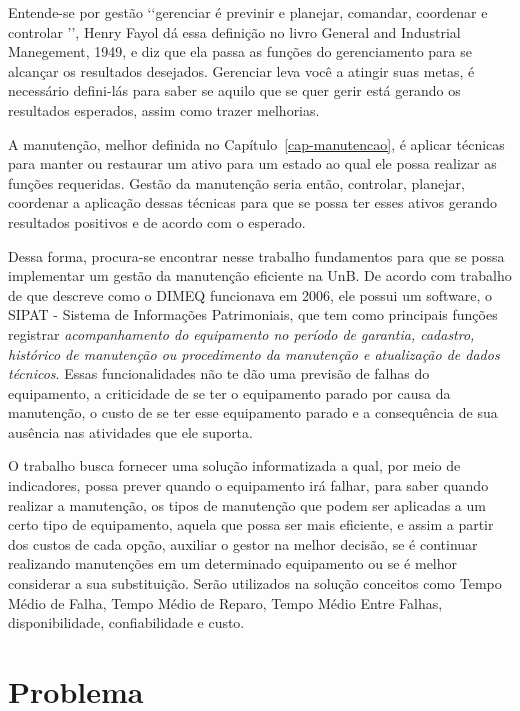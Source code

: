 Entende-se por gestão \lq\lq gerenciar é previnir e planejar, comandar, coordenar e controlar \rq\rq, Henry Fayol dá essa definição no livro General and Industrial Manegement, 1949, e \cite{prasadgulshan2011} diz que ela passa as funções do gerenciamento para se alcançar os resultados desejados. Gerenciar leva você a atingir suas metas, é necessário defini-lás para saber se aquilo que se quer gerir está gerando os resultados esperados, assim como trazer melhorias.

A manutenção, melhor definida no Capítulo~\ref{cap-manutencao}, é aplicar técnicas para manter ou restaurar um ativo para um estado ao qual ele possa realizar as funções requeridas. Gestão da manutenção seria então, controlar, planejar, coordenar a aplicação dessas técnicas para que se possa ter esses ativos gerando resultados positivos e de acordo com o esperado.

Dessa forma, procura-se encontrar nesse trabalho fundamentos para que se possa implementar um gestão da manutenção eficiente na UnB. De acordo com trabalho de \cite{limacastilho2006} que descreve como o DIMEQ funcionava em 2006, ele possui um software, o SIPAT - Sistema de Informações Patrimoniais, que tem como principais funções registrar \emph{acompanhamento do equipamento no período de garantia, cadastro, histórico de manutenção ou procedimento da manutenção e atualização de dados técnicos}. Essas funcionalidades não te dão uma previsão de falhas do equipamento, a criticidade de se ter o equipamento parado por causa da manutenção, o custo de se ter esse equipamento parado e a consequência de sua ausência nas atividades que ele suporta.

O trabalho busca fornecer uma solução informatizada a qual, por meio de indicadores, possa prever quando o equipamento irá falhar, para saber quando realizar a manutenção, os tipos de manutenção que podem ser aplicadas a um certo tipo de equipamento, aquela que possa ser mais eficiente, e assim a partir dos custos de cada opção, auxiliar o gestor na melhor decisão, se é continuar realizando manutenções em um determinado equipamento ou se é melhor considerar a sua substituição. Serão utilizados na solução conceitos como Tempo Médio de Falha, Tempo Médio de Reparo, Tempo Médio Entre Falhas, disponibilidade, confiabilidade e custo. 



\section{Problema}

